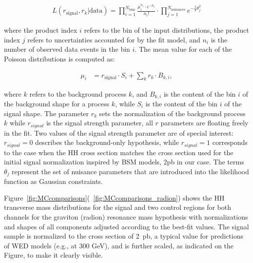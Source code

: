 \begin{align*}
 L(r_{\text{signal}}, r_{k}|\text{data}) = \prod_{i=1}^{N_{\mathrm{bins}}}\frac{\mu_{i}^{n_{i}}\cdot e^{-\mu_{i}}}{n_{i}!}
\cdot \prod_{j=1}^{N_{\mathrm{nuisances}}} e^{-\frac{1}{2}\theta_{j}^{2}}
\end{align*}

\noindent where the product index $i$ refers to the bin of the input distributions, the product index $j$
refers to uncertainties accounted for by the fit model, and $n_i$ is the number of observed data
events in the bin $i$. The mean value for each of the Poisson distributions is computed as:


\begin{align*}
\mu_{i} &= r_{\text{signal}} \cdot S_{i} + \sum_{k}r_{k}\cdot B_{k,i},
\end{align*}


\noindent where $k$ refers to the background process $k$, and $B_{k,i}$ is the content of the bin $i$ of the background
shape for a process $k$, while $S_i$ is the content of the bin $i$ of the signal shape. The parameter $r_k$
sets the normalization of the background process $k$ while $r_{signal}$ is the signal strength parameter, all $r$ parameters are floating freely in the fit.
Two values of the signal strength parameter are of special interest:  $r_{signal} = 0$ describes the
background-only hypothesis, while $r_{signal} = 1$ corresponds to the case when the HH cross section
matches the cross section used for the initial signal normalization inspired by BSM models, 2pb in our case. 
The terms $\theta_j$ represent the set of nuisance parameters that are introduced into the likelihood
function as Gaussian constraints. 


Figure~\ref{fig:MCcomparisons}(~\ref{fig:MCcomparisons_radion}) shows the HH transverse mass distributions
for the signal and two control regions for both channels for the graviton (radion) resonance mass hypothesis with normalizations and shapes of all
components adjusted according to the best-fit values. The signal
sample is normalized to the cross section of 2~pb, a typical value for
predictions of WED models (e.g., at 300 GeV), and is further scaled, as indicated on the
Figure, to make it clearly visible. %




